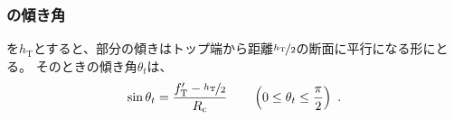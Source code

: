 \subsubsection{\TopCurvedOutcut の傾き角}
\TopOutcutLength を$h_\mathrm T$とすると、\nameCurvedOutcut 部分の傾きはトップ端から距離$\nicefrac{h_\mathrm T}2$の断面に平行になる形にとる。
そのときの傾き角$\theta_t$は、
\begin{align}
  \label{eq:TCurvedOutcutAngle}
  \sin\theta_t = \frac{f_\mathrm T'-\nicefrac{h_\mathrm T}2}{R_\mathrm c}
  \qquad\left(0 \leq \theta_t \leq \frac\pi2\right)\ .
\end{align}

